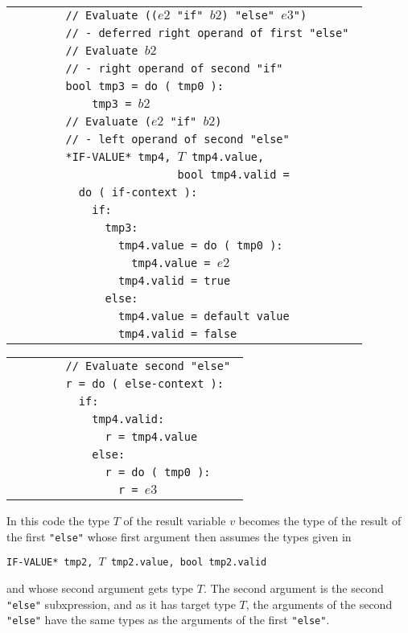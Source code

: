 \documentclass[12pt]{article}
\newenvironment{indpar}[1][0.3in]%
	{\begin{list}{}%
		     {\setlength{\itemsep}{0in}%
		      \setlength{\topsep}{0in}%
		      \setlength{\parsep}{1ex}%
		      \setlength{\labelwidth}{#1}%
		      \setlength{\leftmargin}{#1}%
		      \addtolength{\leftmargin}{\labelsep}}%
	 \item}%
	{\end{list}}
\begin{document}
\begin{indpar}
\begin{tabular}{l}
\tt ~~~~~~~~// Evaluate (($e2$ "if" $b2$) "else" $e3$") \\
\tt ~~~~~~~~// - deferred right operand of first "else" \\
\tt ~~~~~~~~// Evaluate $b2$ \\
\tt ~~~~~~~~// - right operand of second "if" \\
\tt ~~~~~~~~bool tmp3 = do ( tmp0 ): \\
\tt ~~~~~~~~~~~~tmp3 = $b2$ \\
\tt ~~~~~~~~// Evaluate ($e2$ "if" $b2$) \\
\tt ~~~~~~~~// - left operand of second "else" \\
\tt ~~~~~~~~*IF-VALUE* tmp4, $T$ tmp4.value, \\
\tt ~~~~~~~~~~~~~~~~~~~~~~~~~bool tmp4.valid = \\
\tt ~~~~~~~~~~do ( if-context ): \\
\tt ~~~~~~~~~~~~if: \\
\tt ~~~~~~~~~~~~~~tmp3: \\
\tt ~~~~~~~~~~~~~~~~tmp4.value = do ( tmp0 ): \\
\tt ~~~~~~~~~~~~~~~~~~tmp4.value = $e2$ \\
\tt ~~~~~~~~~~~~~~~~tmp4.valid = true \\
\tt ~~~~~~~~~~~~~~else: \\
\tt ~~~~~~~~~~~~~~~~tmp4.value = default value \\
\tt ~~~~~~~~~~~~~~~~tmp4.valid = false \\
\end{tabular}

\begin{tabular}{l}
\tt ~~~~~~~~// Evaluate second "else" \\
\tt ~~~~~~~~r = do ( else-context ): \\
\tt ~~~~~~~~~~if: \\
\tt ~~~~~~~~~~~~tmp4.valid: \\
\tt ~~~~~~~~~~~~~~r = tmp4.value \\
\tt ~~~~~~~~~~~~else: \\
\tt ~~~~~~~~~~~~~~r = do ( tmp0 ): \\
\tt ~~~~~~~~~~~~~~~~r = $e3$ \\
\end{tabular}

\end{indpar}

In this code the type $T$ of the result variable $v$ becomes
the type of the result of the first {\tt "else"} whose
first argument then assumes the types given in
\begin{center}
\tt *IF-VALUE* tmp2, $T$ tmp2.value, bool tmp2.valid
\end{center}
and whose second argument gets type $T$.  The second argument
is the second {\tt "else"} subxpression, and as it has
target type $T$, the arguments of the second {\tt "else"}
have the same types as the arguments of the first {\tt "else"}.
\end{document}
